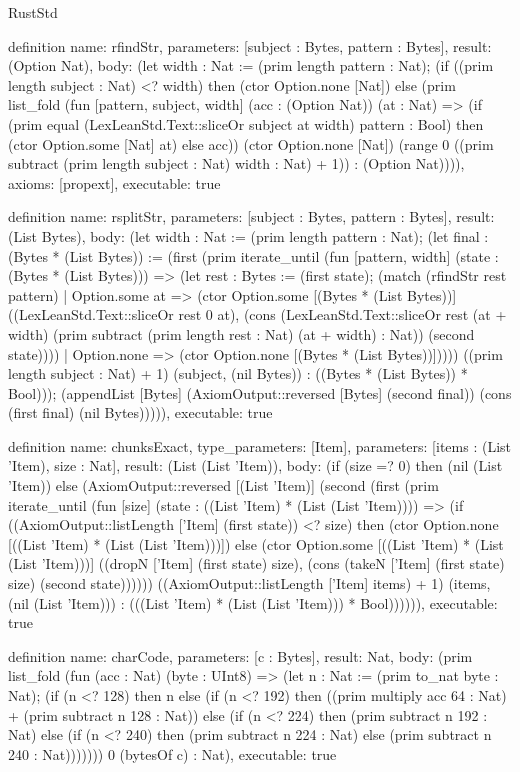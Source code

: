 \begin{lexlean}{RustStd}
\begin{semanticmodule}
definition{
  name: rfindStr,
  parameters: [subject : Bytes, pattern : Bytes],
  result: (Option Nat),
  body: (let width : Nat := (prim length pattern : Nat); (if ((prim length subject : Nat) <? width) then (ctor Option.none [Nat]) else (prim list_fold (fun [pattern, subject, width] (acc : (Option Nat)) (at : Nat) => (if (prim equal (LexLeanStd.Text::sliceOr subject at width) pattern : Bool) then (ctor Option.some [Nat] at) else acc)) (ctor Option.none [Nat]) (range 0 ((prim subtract (prim length subject : Nat) width : Nat) + 1)) : (Option Nat)))),
  axioms: [propext],
  executable: true
}

definition{
  name: rsplitStr,
  parameters: [subject : Bytes, pattern : Bytes],
  result: (List Bytes),
  body: (let width : Nat := (prim length pattern : Nat); (let final : (Bytes * (List Bytes)) := (first (prim iterate_until (fun [pattern, width] (state : (Bytes * (List Bytes))) => (let rest : Bytes := (first state); (match (rfindStr rest pattern) | Option.some at => (ctor Option.some [(Bytes * (List Bytes))] ((LexLeanStd.Text::sliceOr rest 0 at), (cons (LexLeanStd.Text::sliceOr rest (at + width) (prim subtract (prim length rest : Nat) (at + width) : Nat)) (second state)))) | Option.none => (ctor Option.none [(Bytes * (List Bytes))])))) ((prim length subject : Nat) + 1) (subject, (nil Bytes)) : ((Bytes * (List Bytes)) * Bool))); (appendList [Bytes] (AxiomOutput::reversed [Bytes] (second final)) (cons (first final) (nil Bytes))))),
  executable: true
}

definition{
  name: chunksExact,
  type_parameters: [Item],
  parameters: [items : (List 'Item), size : Nat],
  result: (List (List 'Item)),
  body: (if (size =? 0) then (nil (List 'Item)) else (AxiomOutput::reversed [(List 'Item)] (second (first (prim iterate_until (fun [size] (state : ((List 'Item) * (List (List 'Item)))) => (if ((AxiomOutput::listLength ['Item] (first state)) <? size) then (ctor Option.none [((List 'Item) * (List (List 'Item)))]) else (ctor Option.some [((List 'Item) * (List (List 'Item)))] ((dropN ['Item] (first state) size), (cons (takeN ['Item] (first state) size) (second state)))))) ((AxiomOutput::listLength ['Item] items) + 1) (items, (nil (List 'Item))) : (((List 'Item) * (List (List 'Item))) * Bool)))))),
  executable: true
}

definition{
  name: charCode,
  parameters: [c : Bytes],
  result: Nat,
  body: (prim list_fold (fun (acc : Nat) (byte : UInt8) => (let n : Nat := (prim to_nat byte : Nat); (if (n <? 128) then n else (if (n <? 192) then ((prim multiply acc 64 : Nat) + (prim subtract n 128 : Nat)) else (if (n <? 224) then (prim subtract n 192 : Nat) else (if (n <? 240) then (prim subtract n 224 : Nat) else (prim subtract n 240 : Nat))))))) 0 (bytesOf c) : Nat),
  executable: true
}


\end{semanticmodule}
\end{lexlean}
